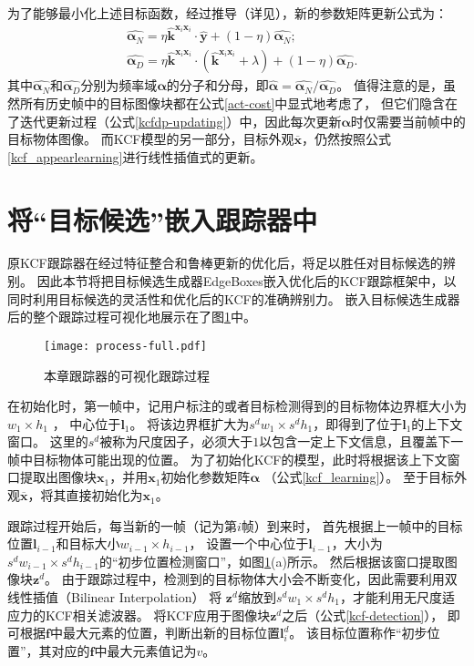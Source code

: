 为了能够最小化上述目标函数，经过推导（详见\cite{act}），新的参数矩阵更新公式为：
\begin{equation}
\begin{aligned}
	&\hat{\boldsymbol{\alpha}_N}=\eta\hat{\mathbf{k}}^{\mathbf{x}_i \mathbf{x}_i} \cdot \hat{\mathbf{y}} + (1-\eta){\hat{\boldsymbol{\alpha}_N}};
	\\
	&\hat{\boldsymbol{\alpha}_D}=\eta\hat{\mathbf{k}}^{\mathbf{x}_i \mathbf{x}_i} \cdot (\hat{\mathbf{k}}^{\mathbf{x}_i \mathbf{x}_i} +
	\lambda) + (1-\eta){\hat{\boldsymbol{\alpha}_D}}.\label{kcfdp-updating}
\end{aligned}
\end{equation}
其中$\hat{\boldsymbol{\alpha}_N}$和$\hat{\boldsymbol{\alpha}_D}$分别为频率域$\boldsymbol{\alpha}$的分子和分母，即$\hat{\boldsymbol{\alpha}}={\hat{{\boldsymbol{\alpha}_N}}}/{\hat{{\boldsymbol{\alpha}_D}}}$。
值得注意的是，虽然所有历史帧中的目标图像块都在公式\ref{act-cost}中显式地考虑了，
但它们隐含在了迭代更新过程（公式\ref{kcfdp-updating}）中，因此每次更新$\boldsymbol{\alpha}$时仅需要当前帧中的目标物体图像。
而KCF模型的另一部分，目标外观$\overline{\mathbf{x}}$，仍然按照公式\ref{kcf_appearlearning}进行线性插值式的更新。

\section{将``目标候选''嵌入跟踪器中}
原KCF跟踪器在经过特征整合和鲁棒更新的优化后，将足以胜任对目标候选的辨别。
因此本节将把目标候选生成器EdgeBoxes嵌入优化后的KCF跟踪框架中，以同时利用目标候选的灵活性和优化后的KCF的准确辨别力。
嵌入目标候选生成器后的整个跟踪过程可视化地展示在了图\ref{process}中。

\begin{figure}[htb]
\centering
\texttt{[image: process-full.pdf]}
\caption{本章跟踪器的可视化跟踪过程}
\label{process}
\end{figure}

在初始化时，第一帧中，记用户标注的或者目标检测得到的目标物体边界框大小为$w_1\times h_1$ ，
中心位于$\mathbf{l}_1$。
将该边界框扩大为$s^dw_1\times s^dh_1$，即得到了位于$\mathbf{l}_1$的上下文窗口。
这里的$s^d$被称为尺度因子，必须大于$1$以包含一定上下文信息，且覆盖下一帧中目标物体可能出现的位置。
为了初始化KCF的模型，此时将根据该上下文窗口提取出图像块$\mathbf{x}_1$，并用$\mathbf{x}_1$初始化参数矩阵${\boldsymbol{\alpha}}$ （公式\ref{kcf_learning}）。
至于目标外观$\overline{\mathbf{x}}$，将其直接初始化为$\mathbf{x}_1$。

跟踪过程开始后，每当新的一帧（记为第$i$帧）到来时，
首先根据上一帧中的目标位置$\mathbf{l}_{i-1}$和目标大小$w_{i-1}\times h_{i-1}$，
设置一个中心位于$\mathbf{l}_{i-1}$，大小为$s^dw_{i-1}\times s^dh_{i-1}$的``初步位置检测窗口''，如图\ref{process}(a)所示。
然后根据该窗口提取图像块$\mathbf{z}^d$。
由于跟踪过程中，检测到的目标物体大小会不断变化，因此需要利用双线性插值（Bilinear Interpolation）
将 $\mathbf{z}^d$缩放到$s^dw_1\times s^dh_1$，才能利用无尺度适应力的KCF相关滤波器。
将KCF应用于图像块$\mathbf{z}^d$之后（公式\ref{kcf-detection}），
即可根据$\mathbf{f}$中最大元素的位置，判断出新的目标位置$\mathbf{l}^d_i$。
该目标位置称作``初步位置''，其对应的$\mathbf{f}$中最大元素值记为$v$。

